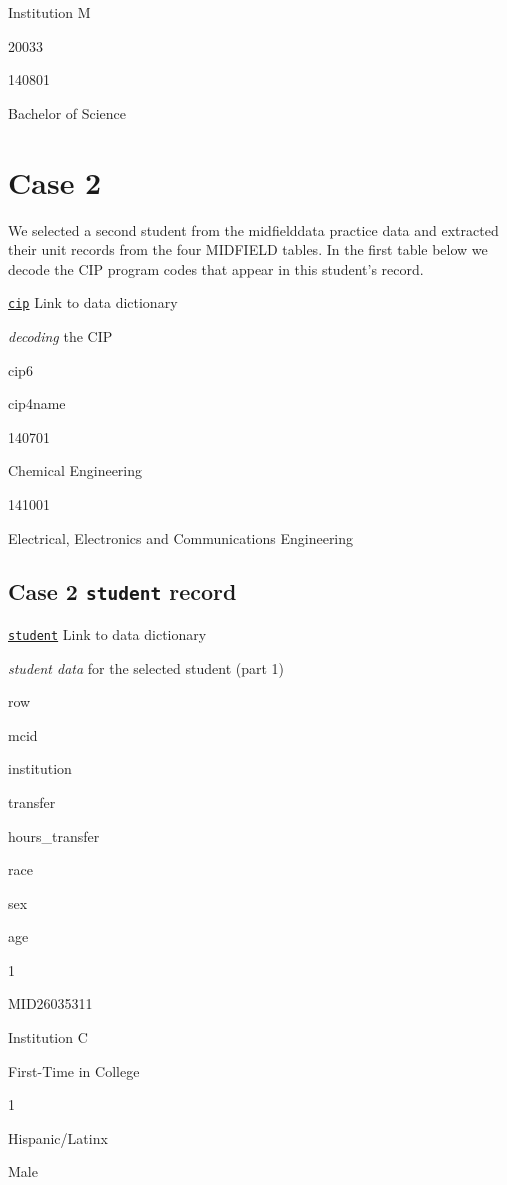 \documentclass[
]{book}
\begin{document}
Institution M

20033

140801

Bachelor of Science

\hypertarget{case-2}{%
\section{Case 2}\label{case-2}}

We selected a second student from the midfielddata practice data and extracted their unit records from the four MIDFIELD tables. In the first table below we decode the CIP program codes that appear in this student's record.

\href{https://midfieldr.github.io/midfieldr/reference/cip.html}{\texttt{cip}} Link to data dictionary

\emph{decoding} the CIP

cip6

cip4name

140701

Chemical Engineering

141001

Electrical, Electronics and Communications Engineering

\hypertarget{case-2-student-record}{%
\subsection{\texorpdfstring{Case 2 \texttt{student} record}{Case 2 student record}}\label{case-2-student-record}}

\href{https://midfieldr.github.io/midfielddata/reference/student.html}{\texttt{student}} Link to data dictionary

\emph{student data} for the selected student (part 1)

row

mcid

institution

transfer

hours\_transfer

race

sex

age

1

MID26035311

Institution C

First-Time in College

1

Hispanic/Latinx

Male
\end{document}
